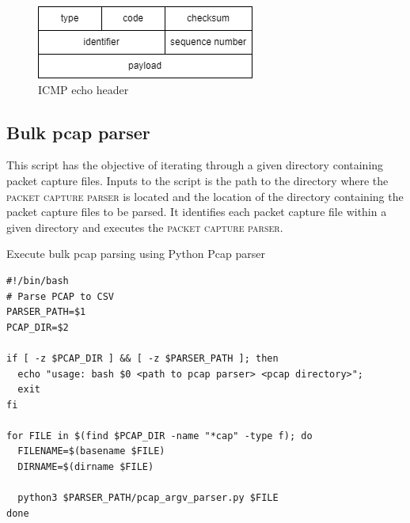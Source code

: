 \begin{figure}[ht]%
    \centering
    \includegraphics[scale=0.6]{images/misc/ICMP-Echo-Header.png}
    \caption{ICMP echo header}
    \label{fig:ICMPEchoHeader}%
\end{figure}

\newpage



\newpage

\subsection{Bulk pcap parser}
This script has the objective of iterating through a given directory containing packet capture files.
Inputs to the script is the path to the directory where the \textsc{packet capture parser} is located and the location of the directory containing the packet capture files to be parsed.
It identifies each packet capture file within a given directory and executes the \textsc{packet capture parser}.

\begin{listing}[!ht]
\caption{Execute bulk pcap parsing using Python Pcap parser}
\label{lst:BulkPcapParser}
\begin{verbatim}
#!/bin/bash
# Parse PCAP to CSV
PARSER_PATH=$1
PCAP_DIR=$2

if [ -z $PCAP_DIR ] && [ -z $PARSER_PATH ]; then
  echo "usage: bash $0 <path to pcap parser> <pcap directory>";
  exit
fi

for FILE in $(find $PCAP_DIR -name "*cap" -type f); do
  FILENAME=$(basename $FILE)
  DIRNAME=$(dirname $FILE)

  python3 $PARSER_PATH/pcap_argv_parser.py $FILE
done
\end{verbatim}
\end{listing}


